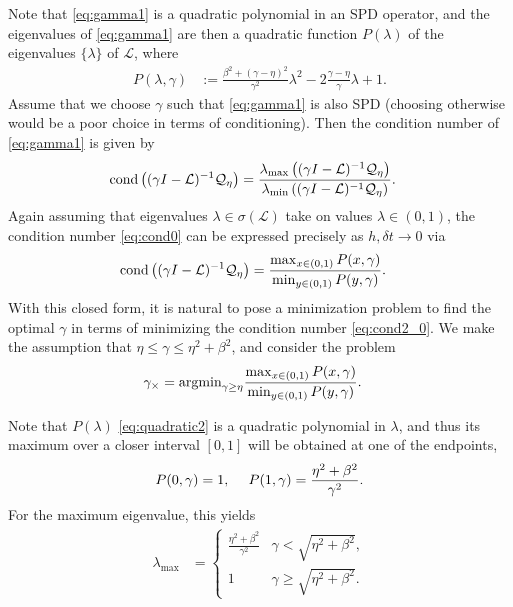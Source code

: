 \documentclass[a4paper,10pt]{article}
\begin{document}
Note that \eqref{eq:gamma1} is a quadratic polynomial in an SPD operator, and the
eigenvalues of \eqref{eq:gamma1} are then a quadratic function $P(\lambda)$ of the
eigenvalues $\{\lambda\}$ of ${\mathcal{L}}$, where
%
\begin{align}\label{eq:quadratic2}
P(\lambda,\gamma) &:= \frac{\beta^2 + (\gamma-\eta)^2}{\gamma^2}\lambda^2 -
	2\frac{\gamma - \eta}{\gamma}\lambda + 1.
\end{align}
%
Assume that we choose $\gamma$ such that \eqref{eq:gamma1} is also SPD (choosing otherwise
would be a poor choice in terms of conditioning). Then the condition number of
\eqref{eq:gamma1} is given by
%
\begin{align}\label{eq:cond2_0}
\textnormal{cond}\left((\gamma I- {\mathcal{L}})^{-1}\mathcal{Q}_\eta\right) & =
	\frac{\lambda_{\max}\left((\gamma I- {\mathcal{L}})^{-1}\mathcal{Q}_\eta\right)}
		{\lambda_{\min}\left((\gamma I- {\mathcal{L}})^{-1}\mathcal{Q}_\eta\right)}.
\end{align}
%
Again assuming that eigenvalues $\lambda\in\sigma\left({\mathcal{L}}\right)$ take
on values $\lambda\in(0,1)$, the condition number \eqref{eq:cond0} can be expressed
precisely as $h,\delta t\to 0$ via
%
\begin{align}\label{eq:cond2_1}
\textnormal{cond}\left((\gamma I- {\mathcal{L}})^{-1}\mathcal{Q}_\eta\right) & =
	\frac{\max_{x\in(0,1)} P(x,\gamma)}{\min_{y\in(0,1)} P(y,\gamma)}.
\end{align}
%
With this closed form, it is natural to pose a minimization problem to find the
optimal $\gamma$ in terms of minimizing the condition number \eqref{eq:cond2_0}.
We make the assumption that $\eta \leq \gamma \leq \eta^2+\beta^2$, and consider
the problem
%
\begin{align*}
\gamma_\times & = \textnormal{argmin}_{\gamma \geq \eta}
	\frac{\max_{x\in(0,1)} P(x,\gamma)}{\min_{y\in(0,1)} P(y,\gamma)}.
\end{align*}
%

Note that $P(\lambda)$ \eqref{eq:quadratic2} is a quadratic polynomial in $\lambda$,
and thus its maximum over a closer interval $[0,1]$ will be obtained at one of the
endpoints,
%
\begin{align*}
P(0,\gamma) = 1, \hspace{3ex} P(1,\gamma) = \frac{\eta^2+\beta^2}{\gamma^2}.
\end{align*}
%
For the maximum eigenvalue, this yields
%
\begin{align}\label{eq:max0}
\lambda_{\max} & = \begin{cases} 
	\frac{\eta^2+\beta^2}{\gamma^2} & \gamma < \sqrt{\eta^2+\beta^2}, \\
	1 & \gamma \geq \sqrt{\eta^2+\beta^2}.
	\end{cases}
\end{align}
%
\end{document}
